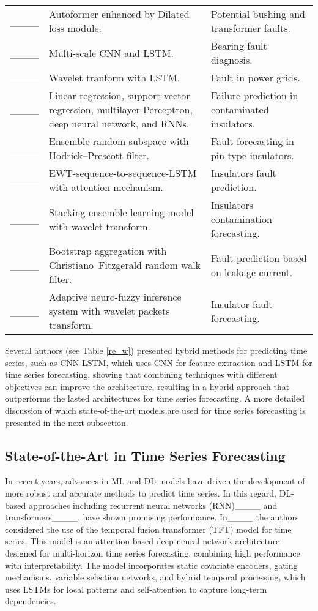 \begin{table}[]
\begin{tabular}{p{3.6cm}p{6cm}p{5cm}}
____ & Autoformer enhanced by Dilated loss module. & Potential bushing and transformer faults.\\
____ & Multi-scale CNN and LSTM. & Bearing fault diagnosis. \\
____ & Wavelet tranform with LSTM. & Fault %
in power grids.\\
____ & Linear regression, support vector regression, multilayer Perceptron, deep neural network, and RNNs. & Failure prediction in contaminated insulators.\\
____ & Ensemble random subspace with Hodrick–Prescott filter.& Fault forecasting in pin-type insulators.\\
____ & EWT-sequence-to-sequence-LSTM with attention mechanism. &  Insulators fault prediction.\\
____ & Stacking ensemble learning model with wavelet transform. & Insulators contamination forecasting.\\
____ & Bootstrap aggregation with Christiano–Fitzgerald random walk filter. & Fault prediction based on leakage current.\\
____ & Adaptive neuro-fuzzy inference system with wavelet packets transform. & Insulator fault forecasting.\\
\hline 
\end{tabular}
\end{table}

Several authors (see Table \ref{re_w}) presented hybrid methods for predicting time series, such as CNN-LSTM, which uses CNN for feature extraction and LSTM for time series forecasting, showing that combining techniques with different objectives can improve the architecture, resulting in a hybrid approach that outperforms the lasted architectures for time series forecasting. A more detailed discussion of which state-of-the-art models are used for time series forecasting is presented in the next subsection.

\subsection{State-of-the-Art in Time Series Forecasting}

In recent years, advances in ML and DL models have driven the development of more robust and accurate methods to predict time series. 
In this regard, DL-based approaches including recurrent neural networks (RNN)____ and transformers____, have shown promising performance.
In____ the authors considered the use of the temporal fusion transformer (TFT) model for time series. This model is an attention-based deep neural network architecture designed for multi-horizon time series forecasting, combining high performance with interpretability. The model incorporates static covariate encoders, gating mechanisms, variable selection networks, and hybrid temporal processing, which uses LSTMs for local patterns and self-attention to capture long-term dependencies.

